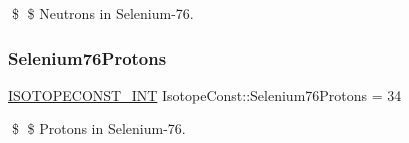\$ \$ Neutrons in Selenium-\/76. \mbox{\label{group___isotope_const-_selenium-_se76_ga8b3d2e42e68430de233c3d6315e905b3}} 
\subsubsection{\texorpdfstring{Selenium76\+Protons}{Selenium76Protons}}
{\footnotesize\ttfamily \mbox{\hyperlink{group___isotope_const-_macros_ga5f18360b3e99483a35c32d789e62621c}{I\+S\+O\+T\+O\+P\+E\+C\+O\+N\+S\+T\+\_\+\+I\+NT}} Isotope\+Const\+::\+Selenium76\+Protons = 34}

\$ \$ Protons in Selenium-\/76. 